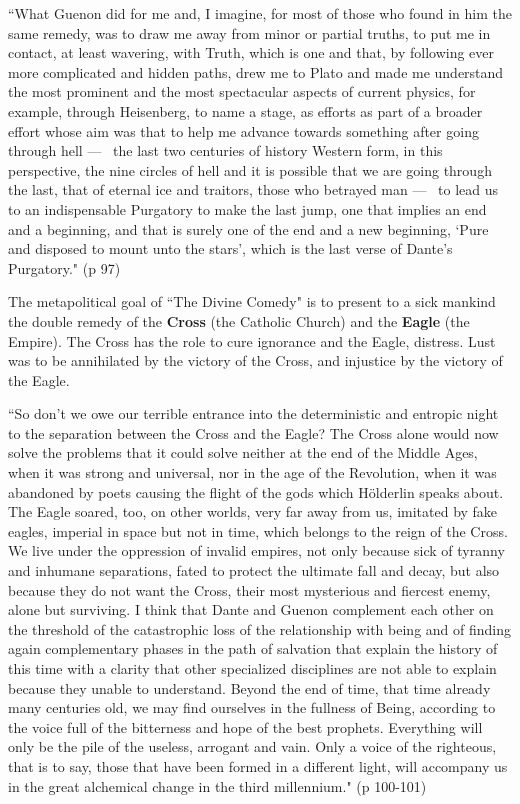 \begin{quotex}
``What Guenon did for me and, I imagine, for most of those who found in him the same remedy, was to draw me away from minor or partial truths, to put me in contact, at least wavering, with Truth, which is one and that, by following ever more complicated and hidden paths, drew me to Plato and made me understand the most prominent and the most spectacular aspects of current physics, for example, through Heisenberg, to name a stage, as efforts as part of a broader effort whose aim was that to help me advance towards something after going through hell —  the last two centuries of history Western form, in this perspective, the nine circles of hell and it is possible that we are going through the last, that of eternal ice and traitors, those who betrayed man —  to lead us to an indispensable Purgatory to make the last jump, one that implies an end and a beginning, and that is surely one of the end and a new beginning, `Pure and disposed to mount unto the stars', which is the last verse of Dante's Purgatory." (p 97) 

\end{quotex}
The metapolitical goal of ``The Divine Comedy" is to present to a sick mankind the double remedy of the \textbf{Cross} (the Catholic Church) and the \textbf{Eagle} (the Empire). The Cross has the role to cure ignorance and the Eagle, distress. Lust was to be annihilated by the victory of the Cross, and injustice by the victory of the Eagle.

\begin{quotex}
``So don't we owe our terrible entrance into the deterministic and entropic night to the separation between the Cross and the Eagle? The Cross alone would now solve the problems that it could solve neither at the end of the Middle Ages, when it was strong and universal, nor in the age of the Revolution, when it was abandoned by poets causing the flight of the gods which Hölderlin speaks about. The Eagle soared, too, on other worlds, very far away from us, imitated by fake eagles, imperial in space but not in time, which belongs to the reign of the Cross. We live under the oppression of invalid empires, not only because sick of tyranny and inhumane separations, fated to protect the ultimate fall and decay, but also because they do not want the Cross, their most mysterious and fiercest enemy, alone but surviving. I think that Dante and Guenon complement each other on the threshold of the catastrophic loss of the relationship with being and of finding again complementary phases in the path of salvation that explain the history of this time with a clarity that other specialized disciplines are not able to explain because they unable to understand. Beyond the end of time, that time already many centuries old, we may find ourselves in the fullness of Being, according to the voice full of the bitterness and hope of the best prophets. Everything will only be the pile of the useless, arrogant and vain. Only a voice of the righteous, that is to say, those that have been formed in a different light, will accompany us in the great alchemical change in the third millennium." (p 100-101) 

\end{quotex}


